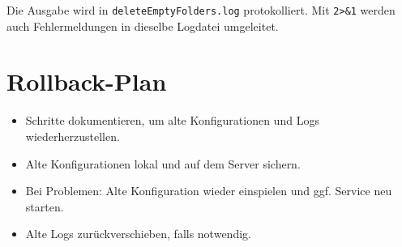 Die Ausgabe wird in \texttt{deleteEmptyFolders.log} protokolliert. Mit \texttt{2>\&1} werden
auch Fehlermeldungen in dieselbe Logdatei umgeleitet.

\section{Rollback-Plan}
\begin{itemize}
    \item Schritte dokumentieren, um alte Konfigurationen und Logs wiederherzustellen.
    \item Alte Konfigurationen lokal und auf dem Server sichern.
    \item Bei Problemen: Alte Konfiguration wieder einspielen und ggf. Service neu starten.
    \item Alte Logs zurückverschieben, falls notwendig.
\end{itemize}